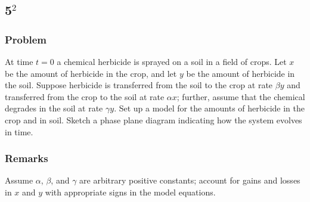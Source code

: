 \documentclass[12pt]{article}
\begin{document}
\subsection{5$^2$}
\subsubsection*{Problem}
At time $t=0$ a chemical herbicide is sprayed on a soil in a field of crops. Let
$x$ be the amount of herbicide in the crop, and let $y$ be the amount of
herbicide in the soil. Suppose herbicide is transferred from the soil to the
crop at rate $\beta y$ and transferred from the crop to the soil at rate $\alpha
x$; further, assume that the chemical degrades in the soil at rate $\gamma y$.
Set up a model for the amounts of herbicide in the crop and in soil. Sketch a
phase plane diagram indicating how the system evolves in time.
\subsubsection*{Remarks}
Assume $\alpha$, $\beta$, and $\gamma$ are arbitrary positive constants; account
for gains and losses in $x$ and $y$ with appropriate signs in the model
equations.
\end{document}
